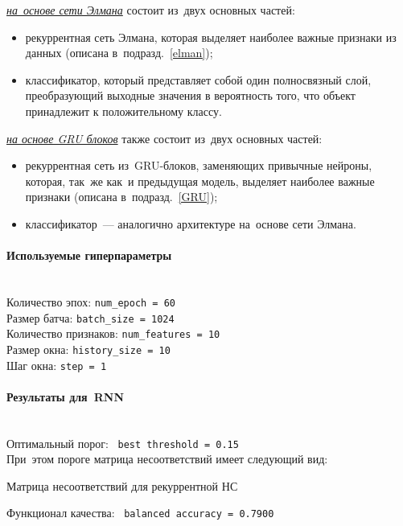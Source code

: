 \noindent
\underline{\emph{на~основе сети Элмана}} состоит из~двух основных частей:
\begin{itemize}[wide]
	\item рекуррентная сеть Элмана, которая выделяет наиболее важные признаки из данных (описана в~подразд.~\ref{elman});	
	\item классификатор, который представляет собой один полносвязный слой, 
	преобразующий выходные значения в вероятность того, что объект принадлежит к положительному классу. 
\end{itemize}

\medskip
\noindent
\underline{\emph{на основе GRU блоков}} также состоит из~двух основных частей:
\begin{itemize}[wide]
	\item рекуррентная сеть из~GRU-блоков, заменяющих привычные нейроны, которая, так~же как~и предыдущая модель, выделяет наиболее важные признаки (описана в~подразд.~\ref{GRU});	
	\item классификатор~--- аналогично архитектуре на~основе сети Элмана. 
\end{itemize}

\paragraph{Используемые гиперпараметры}~\\
Количество эпох: \texttt{num\_epoch = 60} \\
Размер батча: \texttt{batch\_size = 1024} \\
Количество признаков: \texttt{num\_features = 10} \\
Размер окна: \texttt{history\_size = 10} \\
Шаг окна: \texttt{step = 1}

\paragraph{Результаты для~RNN}~\\
Оптимальный порог: \ \texttt{best\ threshold = 0.15}\\
При~этом пороге матрица несоответствий имеет следующий вид:

\begin{table}[!h]
	\centering
	\caption{Матрица несоответствий для рекуррентной НС}\medskip
	
	\label{RNN_conf_mtrx}
\end{table}

\noindent
Функционал качества: \ \texttt{balanced\ accuracy = 0.7900}


